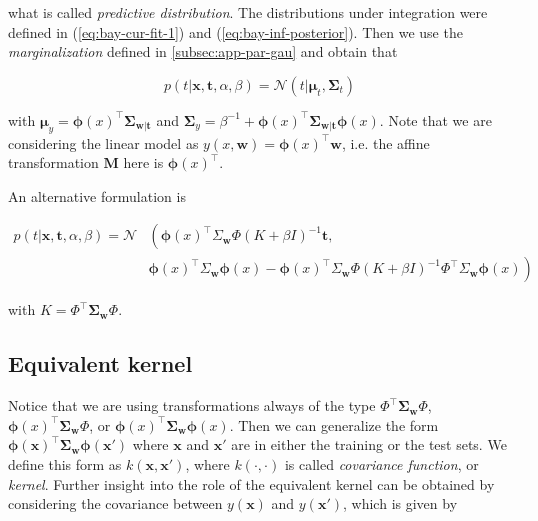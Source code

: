 \documentclass[11pt]{article} %
\begin{document}
what is called \textit{predictive distribution}. The distributions under integration were defined in (\ref{eq:bay-cur-fit-1}) and (\ref{eq:bay-inf-posterior}). Then we use the \textit{marginalization} defined in \autoref{subsec:app-par-gau} and obtain that

\begin{equation}
   p(t | \mathbf{x}, \mathbf{t}, \alpha, \beta)=\mathcal{N}\left(t | \boldsymbol{\mu}_{t}, \boldsymbol{\Sigma}_{t} \right)
\end{equation}

with $\boldsymbol{\mu}_y = \boldsymbol{\phi}(x)^\top \boldsymbol{\Sigma}_{\mathbf{w} | \mathbf{t}}$ and $\boldsymbol{\Sigma}_y = \beta^{-1} + \boldsymbol{\phi}(x)^\top \boldsymbol{\Sigma}_{\mathbf{w} | \mathbf{t}}\boldsymbol{\phi}(x)$. Note that we are considering the linear model as $y(x,\mathbf{w}) = \boldsymbol{\phi}(x)^\top \mathbf{w}$, i.e. the affine transformation $\mathbf{M}$ here is $\boldsymbol{\phi}(x)^\top$.

An alternative formulation \cite{Rasmussen:2005:GPM:1162254} is

\begin{equation}
\begin{aligned}
      p(t | \mathbf{x}, \mathbf{t}, \alpha, \beta) = \mathcal{N} & \left(  \boldsymbol{\phi}(x)^{\top} \Sigma_\mathbf{w} \Phi\left(K+\beta I\right)^{-1} \mathbf{t} \right., \\ &\left.\boldsymbol{\phi}(x)^{\top} \Sigma_\mathbf{w} \boldsymbol{\phi}(x)-\boldsymbol{\phi}(x)^{\top} \Sigma_\mathbf{w} \Phi\left(K+\beta I\right)^{-1} \Phi^{\top} \Sigma_\mathbf{w} \boldsymbol{\phi}(x)\right)
\end{aligned}
\end{equation}

with $K=\Phi^{\top} \boldsymbol{\Sigma}_\mathbf{w} \Phi$.

\subsection{Equivalent kernel}

Notice that we are using transformations always of the type $\Phi^{\top} \boldsymbol{\Sigma}_\mathbf{w} \Phi$, $\boldsymbol{\phi}(x)^{\top} \boldsymbol{\Sigma}_\mathbf{w} \Phi$, or $\boldsymbol{\phi}(x)^{\top} \boldsymbol{\Sigma}_\mathbf{w} \boldsymbol{\phi}(x)$. Then we can generalize the form $\boldsymbol{\phi}(\mathbf{x})^\top \boldsymbol{\Sigma}_\mathbf{w}\boldsymbol{\phi}(\mathbf{x'})$ where $\mathbf{x}$ and $\mathbf{x'}$ are in either the training or the test sets. We define this form as $k(\mathbf{x},\mathbf{x'})$, where $k(\cdot,\cdot)$ is called \textit{covariance function}, or \textit{kernel}. Further insight into the role of the equivalent kernel can be obtained by considering the covariance between $y(\mathbf{x})$ and $y(\mathbf{x'})$, which is given by
\end{document}
